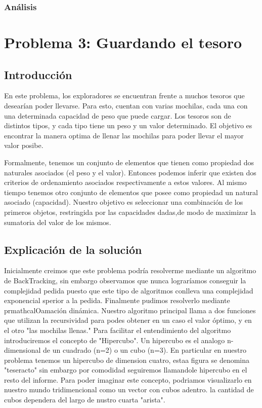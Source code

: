 \documentclass[spanish,12pt]{article}
\begin{document}
\subsubsection{Análisis}





\section{Problema 3: Guardando el tesoro}

\subsection{Introducción}

En este problema, los exploradores se encuentran frente a muchos tesoros que desearían poder llevarse. Para esto, cuentan con varias mochilas, cada una con una determinada capacidad de peso que puede cargar.
Los tesoros son de distintos tipos, y cada tipo tiene un peso y un valor determinado.
El objetivo es encontrar la manera optima de llenar las mochilas para poder llevar el mayor valor posibe.

Formalmente, tenemos un conjunto de elementos que tienen como propiedad dos naturales asociados (el peso y el valor). Entonces podemos inferir que existen dos criterios de ordenamiento asociados respectivamente a estos valores.
Al mismo tiempo tenemos otro conjunto de elementos que posee como propiedad un natural asociado (capacidad).
Nuestro objetivo es seleccionar una combinación de los primeros objetos, restringida por las capacidades dadas,de modo de maximizar la sumatoria del valor de los mismos.


\subsection{Explicación de la solución}

   Inicialmente creimos que este problema podría resolverme mediante un algoritmo de BackTracking, sin embargo observamos que nunca lograríamos conseguir la complejidad pedida puesto que este tipo de algoritmos conlleva una complejidad exponencial sperior a la pedida.
   Finalmente pudimos resolverlo mediante prmathcal{O}amación dinámica. Nuestro algoritmo principal llama a dos funciones que utilizan la recursividad para podes obtener en un caso el valor óptimo, y en el otro "las mochilas llenas."
   Para facilitar el entendimiento del algoritmo introduciremos el concepto de "Hipercubo". Un hipercubo es el analogo n-dimensional de un cuadrado (n=2) o un cubo (n=3). En particular en nuestro problema tenemos un hipercubo de dimension cuatro, estaa figura se denomina "teseracto" sin embargo por comodidad seguiremos llamandole hipercubo en el resto del informe. 
Para poder imaginar este concepto, podriamos visualizarlo en nuestro mundo tridimencional como un vector con cubos adentro. la cantidad de cubos dependera del largo de nustro cuarta "arista".
\end{document}
